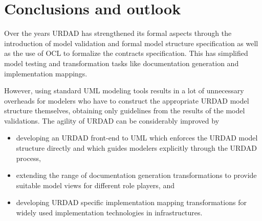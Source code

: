 
\section{Conclusions and outlook}
\label{sec:conclusions}

Over the years URDAD has strengthened its formal aspects through the introduction of model validation
and formal model structure specification as well as the use of OCL to formalize the contracts specification.
This has simplified model testing and transformation tasks like documentation generation and 
implementation mappings.

However, using standard UML modeling tools results in a lot of unnecessary overheads for modelers who 
have to construct the appropriate URDAD model structure themselves, obtaining only guidelines from 
the results of the model validations. The agility of URDAD can be considerably improved by
\begin{itemize}
  \item developing an URDAD front-end to UML which enforces the URDAD model structure directly and 
which guides modelers explicitly through the URDAD process, 
  \item extending the range of documentation generation transformations to provide suitable 
model views for different role players, and
  \item developing URDAD specific implementation mapping transformations for widely used 
implementation technologies in infrastructures.
\end{itemize}


